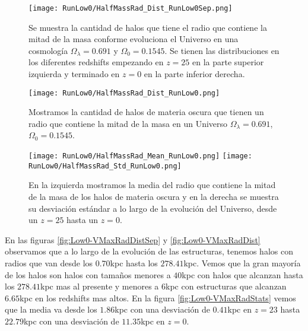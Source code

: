 \begin{figure}[H]
    \centering
    \texttt{[image: RunLow0/HalfMassRad\_Dist\_RunLow0Sep.png]}
    \caption[Radio que contiene la mitad de la masa en la evolución de un Universo $\Omega_\lambda = 0.691$, $\Omega_0 = 0.1545$]{\footnotesize Se muestra la cantidad de halos que tiene el radio que contiene la mitad de la masa conforme evoluciona el Universo en una cosmología $\Omega_\lambda = 0.691$ y $\Omega_0 = 0.1545$. Se tienen las distribuciones en los diferentes redshifts empezando en $z=25$ en la parte superior izquierda y terminado en $z=0$ en la parte inferior derecha.}
    \label{fig:Low0-HalfMassRadDistSep}
\end{figure}

\begin{figure}[H]
    \centering
    \texttt{[image: RunLow0/HalfMassRad\_Dist\_RunLow0.png]}
    \caption[Distribución del radio que contiene la mitad de la masa en un Universo $\Omega_\lambda = 0.691$, $\Omega_0 = 0.1545$]{\footnotesize Mostramos la cantidad de halos de materia oscura que tienen un radio que contiene la mitad de la masa en un Universo $\Omega_\lambda = 0.691$, $\Omega_0 = 0.1545$.}
    \label{fig:Low0-HalfMassRadDist}
\end{figure}

\begin{figure}[H]
    \centering
    \texttt{[image: RunLow0/HalfMassRad\_Mean\_RunLow0.png]}
    \texttt{[image: RunLow0/HalfMassRad\_Std\_RunLow0.png]}
    \caption[Media y desviación estándar del radio de la mitad de la masa de un Universo $\Omega_\lambda = 0.691$, $\Omega_0 = 0.1545$]{\footnotesize En la izquierda mostramos la media del radio que contiene la mitad de la masa de los halos de materia oscura y en la derecha se muestra su desviación estándar a lo largo de la evolución del Universo, desde un $z=25$ hasta un $z=0$.}
    \label{fig:Low0-HalfMassRadStats}
\end{figure}

En las figuras \ref{fig:Low0-VMaxRadDistSep} y \ref{fig:Low0-VMaxRadDist} observamos que a lo largo de la evolución de las estructuras, tenemos halos con radios que van desde los $0.70$kpc hasta los $278.41$kpc. Vemos que la gran mayoría de los halos son halos con tamaños menores a $40$kpc con halos que alcanzan hasta los $278.41$kpc mas al presente y menores a $6$kpc con estructuras que alcanzan $6.65$kpc en los redshifts mas altos. En la figura \ref{fig:Low0-VMaxRadStats} vemos que la media va desde los $1.86$kpc con una desviación de $0.41$kpc en $z=23$ hasta $22.79$kpc con una desviación de $11.35$kpc en $z=0$.

